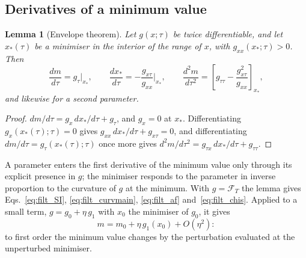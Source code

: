 \documentclass[10pt,a4paper]{article}
\theoremstyle{plain}
\newtheorem{lemma}{Lemma}
\newcommand{\Fen}[1][T]{\mathscr{F}_{#1}}  %
\begin{document}
\subsection{Derivatives of a minimum value}
\label{sec:tools_env}

\begin{lemma}[Envelope theorem]\label{lem:envelope}
Let $g(x;\tau)$ be twice differentiable, and let $x_*(\tau)$ be a minimiser
in the interior of the range of $x$, with $g_{xx}(x_*;\tau)>0$. Then
\begin{equation}\label{eq:tools_env}
  \frac{dm}{d\tau}=g_\tau\Big|_{x_*} ,\qquad
  \frac{dx_*}{d\tau}=-\frac{g_{x\tau}}{g_{xx}}\Big|_{x_*} ,\qquad
  \frac{d^{2}m}{d\tau^{2}}=\left[g_{\tau\tau}-\frac{g_{x\tau}^{2}}{g_{xx}}\right]_{x_*} ,
\end{equation}
and likewise for a second parameter.
\end{lemma}
\begin{proof}
$dm/d\tau=g_x\,dx_*/d\tau+g_\tau$, and $g_x=0$ at $x_*$. Differentiating
$g_x(x_*(\tau);\tau)=0$ gives $g_{xx}\,dx_*/d\tau+g_{x\tau}=0$, and
differentiating $dm/d\tau=g_\tau(x_*(\tau);\tau)$ once more gives
$d^{2}m/d\tau^{2}=g_{\tau x}\,dx_*/d\tau+g_{\tau\tau}$.
\end{proof}
A parameter enters the first derivative of the minimum value only through
its explicit presence in $g$; the minimiser responds to the parameter in
inverse proportion to the curvature of $g$ at the minimum. With $g=\Fen$ the
lemma gives Eqs.~\eqref{eq:filt_SI}, \eqref{eq:filt_curvmain},
\eqref{eq:filt_af} and~\eqref{eq:filt_chis}. Applied to a small term,
$g=g_0+\eta\,g_1$ with $x_0$ the minimiser of $g_0$, it gives
\begin{equation}\label{eq:tools_pert}
  m=m_0+\eta\,g_1(x_0)+O(\eta^{2}) :
\end{equation}
to first order the minimum value changes by the perturbation evaluated at
the unperturbed minimiser.
\end{document}
